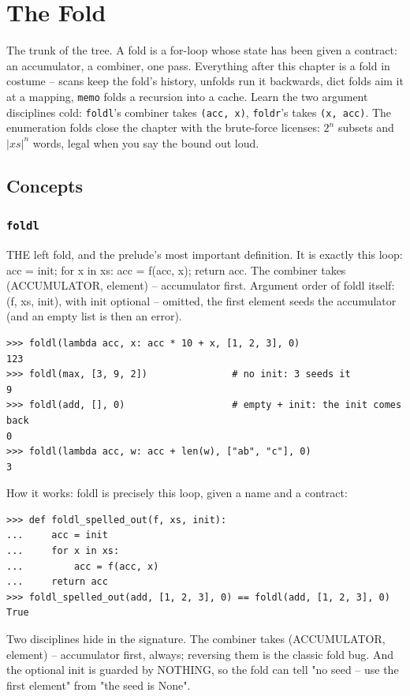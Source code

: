 \documentclass[10pt,letterpaper]{book}
\begin{document}
\clearpage
\chapter{The Fold}

The trunk of the tree. A fold is a for-loop whose state has been given a
contract: an accumulator, a combiner, one pass. Everything after this chapter
is a fold in costume -- scans keep the fold's history, unfolds run it
backwards, dict folds aim it at a mapping, \texttt{memo} folds a recursion
into a cache. Learn the two argument disciplines cold: \texttt{foldl}'s
combiner takes \texttt{(acc, x)}, \texttt{foldr}'s takes \texttt{(x, acc)}.
The enumeration folds close the chapter with the brute-force licenses:
$2^n$ subsets and $|xs|^n$ words, legal when you say the bound out loud.
\section{Concepts}
\subsection{\texttt{foldl}}\label{def:foldl}
THE left fold, and the prelude's most important definition. It is exactly this loop: acc = init; for x in xs: acc = f(acc, x); return acc. The combiner takes (ACCUMULATOR, element) -- accumulator first. Argument order of foldl itself: (f, xs, init), with init optional -- omitted, the first element seeds the accumulator (and an empty list is then an error).
\begin{lstlisting}[style=ex]
>>> foldl(lambda acc, x: acc * 10 + x, [1, 2, 3], 0)
123
>>> foldl(max, [3, 9, 2])               # no init: 3 seeds it
9
>>> foldl(add, [], 0)                   # empty + init: the init comes back
0
>>> foldl(lambda acc, w: acc + len(w), ["ab", "c"], 0)
3
\end{lstlisting}

How it works: foldl is precisely this loop, given a name and a contract:

\begin{lstlisting}[style=ex]
>>> def foldl_spelled_out(f, xs, init):
...     acc = init
...     for x in xs:
...         acc = f(acc, x)
...     return acc
>>> foldl_spelled_out(add, [1, 2, 3], 0) == foldl(add, [1, 2, 3], 0)
True
\end{lstlisting}

Two disciplines hide in the signature. The combiner takes (ACCUMULATOR, element) -- accumulator first, always; reversing them is the classic fold bug. And the optional init is guarded by NOTHING, so the fold can tell "no seed -- use the first element" from "the seed is None".
\end{document}

